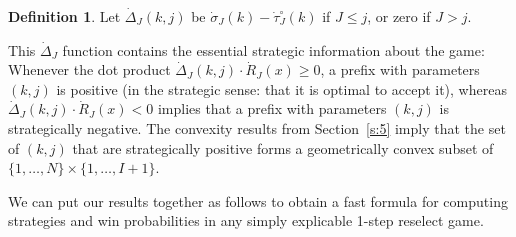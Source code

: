 \documentclass[11pt]{amsart}   %
\theoremstyle{definition}
\newtheorem{definition}[theorem]{Definition}
\theoremstyle{remark}
\numberwithin{equation}{section}
\theoremstyle{theorem}
\begin{document}
\begin{definition}
Let $\dot\Delta_J(k,j)$ be $\dot\sigma_J(k) - \dot\tau^\circ_J(k)$ if $J \leq j$, or zero if $J > j$.
\end{definition}

This $\dot\Delta_J$ function contains the essential strategic information about the game:  Whenever the dot product $\dot\Delta_J(k,j) \cdot \dot{R}_J(x) \geq 0$, a prefix with parameters $(k,j)$ is positive (in the strategic sense:  that it is optimal to accept it), whereas $\dot\Delta_J(k,j) \cdot \dot{R}_J(x) < 0$ implies that a prefix with parameters $(k,j)$ is strategically negative.  The convexity results from Section~\ref{s:5} imply that the set of $(k,j)$ that are strategically positive forms a geometrically convex subset of $\{1, \ldots, N\} \times \{1, \ldots, I+1\}$.

We can put our results together as follows to obtain a fast formula for computing strategies and win probabilities in any simply explicable 1-step reselect game.
\end{document}
